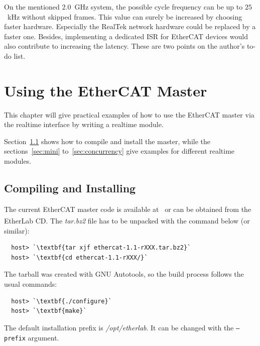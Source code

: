 \documentclass[a4paper,12pt,BCOR6mm,bibtotoc,idxtotoc]{scrbook}
\begin{document}
On the mentioned $2.0$~GHz system, the possible cycle frequency can be
up to $25$~kHz without skipped frames. This value can surely be
increased by choosing faster hardware. Especially the RealTek network
hardware could be replaced by a faster one. Besides, implementing a
dedicated ISR for EtherCAT devices would also contribute to increasing
the latency. These are two points on the author's to-do list.


\chapter{Using the EtherCAT Master}
\label{chapter:usage}

This chapter will give practical examples of how to use the EtherCAT
master via the realtime interface by writing a realtime module.

Section~\ref{sec:make} shows how to compile and install the master,
while the sections~\ref{sec:mini} to~\ref{sec:concurrency} give
examples for different realtime modules.


\section{Compiling and Installing}
\label{sec:make}

The current EtherCAT master code is available at~\cite{etherlab} or
can be obtained from the EtherLab\textsuperscript{\textregistered} CD.
The \textit{tar.bz2} file has to be unpacked with the command below
(or similar):

\begin{lstlisting}
  host> `\textbf{tar xjf ethercat-1.1-rXXX.tar.bz2}`
  host> `\textbf{cd ethercat-1.1-rXXX/}`
\end{lstlisting}

The tarball was created with GNU Autotools, so the build process
follows the usual commands:

\begin{lstlisting}
  host> `\textbf{./configure}`
  host> `\textbf{make}`
\end{lstlisting}

The default installation prefix is \textit{/opt/etherlab}. It can be
changed with the \texttt{--prefix} argument.
\end{document}
